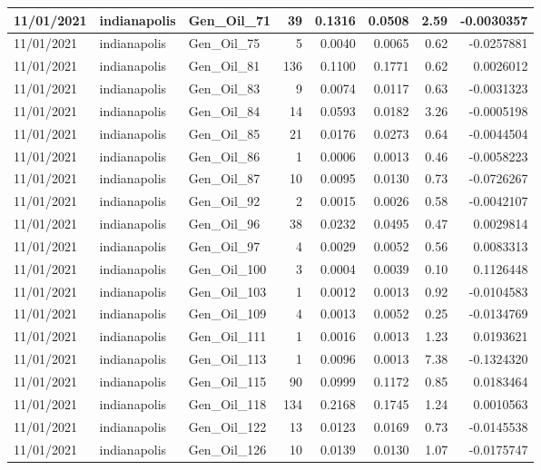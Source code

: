 \documentclass[
  letterpaper,
  DIV=11,
  numbers=noendperiod]{scrartcl}
\begin{document}
\begin{tabular}{l|l|l|r|r|r|r|r}
\hline
11/01/2021 & indianapolis & Gen\_Oil\_71 & 39 & 0.1316 & 0.0508 & 2.59 & -0.0030357\\
\hline
11/01/2021 & indianapolis & Gen\_Oil\_75 & 5 & 0.0040 & 0.0065 & 0.62 & -0.0257881\\
\hline
11/01/2021 & indianapolis & Gen\_Oil\_81 & 136 & 0.1100 & 0.1771 & 0.62 & 0.0026012\\
\hline
11/01/2021 & indianapolis & Gen\_Oil\_83 & 9 & 0.0074 & 0.0117 & 0.63 & -0.0031323\\
\hline
11/01/2021 & indianapolis & Gen\_Oil\_84 & 14 & 0.0593 & 0.0182 & 3.26 & -0.0005198\\
\hline
11/01/2021 & indianapolis & Gen\_Oil\_85 & 21 & 0.0176 & 0.0273 & 0.64 & -0.0044504\\
\hline
11/01/2021 & indianapolis & Gen\_Oil\_86 & 1 & 0.0006 & 0.0013 & 0.46 & -0.0058223\\
\hline
11/01/2021 & indianapolis & Gen\_Oil\_87 & 10 & 0.0095 & 0.0130 & 0.73 & -0.0726267\\
\hline
11/01/2021 & indianapolis & Gen\_Oil\_92 & 2 & 0.0015 & 0.0026 & 0.58 & -0.0042107\\
\hline
11/01/2021 & indianapolis & Gen\_Oil\_96 & 38 & 0.0232 & 0.0495 & 0.47 & 0.0029814\\
\hline
11/01/2021 & indianapolis & Gen\_Oil\_97 & 4 & 0.0029 & 0.0052 & 0.56 & 0.0083313\\
\hline
11/01/2021 & indianapolis & Gen\_Oil\_100 & 3 & 0.0004 & 0.0039 & 0.10 & 0.1126448\\
\hline
11/01/2021 & indianapolis & Gen\_Oil\_103 & 1 & 0.0012 & 0.0013 & 0.92 & -0.0104583\\
\hline
11/01/2021 & indianapolis & Gen\_Oil\_109 & 4 & 0.0013 & 0.0052 & 0.25 & -0.0134769\\
\hline
11/01/2021 & indianapolis & Gen\_Oil\_111 & 1 & 0.0016 & 0.0013 & 1.23 & 0.0193621\\
\hline
11/01/2021 & indianapolis & Gen\_Oil\_113 & 1 & 0.0096 & 0.0013 & 7.38 & -0.1324320\\
\hline
11/01/2021 & indianapolis & Gen\_Oil\_115 & 90 & 0.0999 & 0.1172 & 0.85 & 0.0183464\\
\hline
11/01/2021 & indianapolis & Gen\_Oil\_118 & 134 & 0.2168 & 0.1745 & 1.24 & 0.0010563\\
\hline
11/01/2021 & indianapolis & Gen\_Oil\_122 & 13 & 0.0123 & 0.0169 & 0.73 & -0.0145538\\
\hline
11/01/2021 & indianapolis & Gen\_Oil\_126 & 10 & 0.0139 & 0.0130 & 1.07 & -0.0175747\\

\end{tabular}
\end{document}
